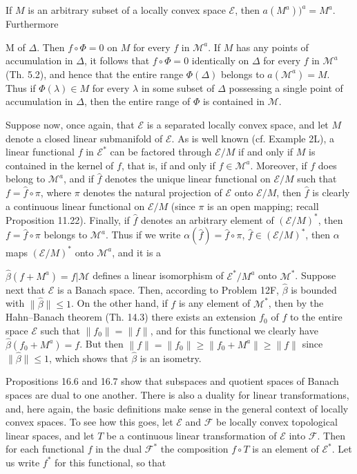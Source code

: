 If $M$ is an arbitrary subset of a locally convex space $\mathcal{E}$, then $a(M^a))^a = M^a$. Furthermore

M of $\Delta$. Then $f \circ \Phi = 0$ on $M$ for every $f$ in $\mathcal{M}^a$. If $M$ has any points of accumulation in $\Delta$, it follows that $f \circ \Phi = 0$ identically on $\Delta$ for every $f$ in $\mathcal{M}^a$ (Th. 5.2), and hence that the entire range $\Phi(\Delta)$ belongs to $a(\mathcal{M}^a) = M$. Thus if $\Phi(\lambda) \in M$ for every $\lambda$ in some subset of $\Delta$ possessing a single point of accumulation in $\Delta$, then the entire range of $\Phi$ is contained in $\mathcal{M}$.

Suppose now, once again, that $\mathcal{E}$ is a separated locally convex space, and let $M$ denote a closed linear submanifold of $\mathcal{E}$. As is well known (cf. Example 2L), a linear functional $f$ in $\mathcal{E}^*$ can be factored through $\mathcal{E}/M$ if and only if $M$ is contained in the kernel of $f$, that is, if and only if $f \in \mathcal{M}^a$. Moreover, if $f$ does belong to $\mathcal{M}^a$, and if $\hat{f}$ denotes the unique linear functional on $\mathcal{E}/M$ such that $f = \hat{f} \circ \pi$, where $\pi$ denotes the natural projection of $\mathcal{E}$ onto $\mathcal{E}/M$, then $\hat{f}$ is clearly a continuous linear functional on $\mathcal{E}/M$ (since $\pi$ is an open mapping; recall Proposition 11.22). Finally, if $\hat{f}$ denotes an arbitrary element of $(\mathcal{E}/M)^*$, then $f = \hat{f} \circ \pi$ belongs to $\mathcal{M}^a$. Thus if we write $\alpha(\hat{f}) = \hat{f} \circ \pi$, $\hat{f} \in (\mathcal{E}/M)^*$, then $\alpha$ maps $(\mathcal{E}/M)^*$ onto $\mathcal{M}^a$, and it is a

$\hat{\beta}(f + M^a) = f | \mathcal{M}$ defines a linear isomorphism of $\mathcal{E}^* / M^a$ onto $\mathcal{M}^*$. Suppose next that $\mathcal{E}$ is a Banach space. Then, according to Problem 12F, $\hat{\beta}$ is bounded with $\|\hat{\beta}\| \leq 1$. On the other hand, if $f$ is any element of $\mathcal{M}^*$, then by the Hahn–Banach theorem (Th. 14.3) there exists an extension $f_0$ of $f$ to the entire space $\mathcal{E}$ such that $\|f_0\| = \|f\|$, and for this functional we clearly have $\hat{\beta}(f_0 + M^a) = f$. But then $\|f\| = \|f_0\| \geq \|f_0 + M^a\| \geq \|f\|$ since $\|\hat{\beta}\| \leq 1$, which shows that $\hat{\beta}$ is an isometry.

Propositions 16.6 and 16.7 show that subspaces and quotient spaces of Banach spaces are dual to one another. There is also a duality for linear transformations, and, here again, the basic definitions make sense in the general context of locally convex spaces. To see how this goes, let $\mathcal{E}$ and $\mathcal{F}$ be locally convex topological linear spaces, and let $T$ be a continuous linear transformation of $\mathcal{E}$ into $\mathcal{F}$. Then for each functional $f$ in the dual $\mathcal{F}^*$ the composition $f \circ T$ is an element of $\mathcal{E}^*$. Let us write $f^*$ for this functional, so that

